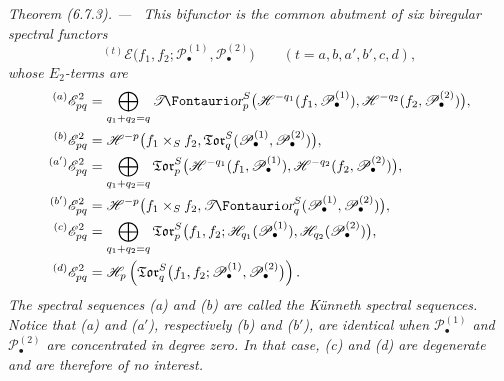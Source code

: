 \documentclass[10pt,oneside]{book}
\newcommand{\sh}[1]{\mathscr{#1}}
\newcommand{\shTor}{\sh{T}\textup{\kern-2.2pt{\Fontauri\slshape or}}}
\newenvironment{theorem}[1][]{\par\medskip\noindent\itshape Theorem (#1). ---\ }{\par}
\begin{document}
\begin{theorem}[6.7.3]
This bifunctor is the common abutment of six biregular spectral
functors
\[
  {}^{(t)}\sh E
  \bigl(
    f_1,f_2;
    \sh P_\bullet^{(1)},\sh P_\bullet^{(2)}
  \bigr)
  \qquad(t=a,b,a',b',c,d),
\]
whose $E_2$-terms are
\[
\begin{aligned}
  {}^{(a)}\sh E_{pq}^2
  &=
  \bigoplus_{q_1+q_2=q}
  \shTor_p^S
  \bigl(
    \sh H^{-q_1}(f_1,\sh P_\bullet^{(1)}),
    \sh H^{-q_2}(f_2,\sh P_\bullet^{(2)})
  \bigr),\\
  {}^{(b)}\sh E_{pq}^2
  &=
  \sh H^{-p}
  \bigl(
    f_1\times_Sf_2,
    \mathfrak{Tor}_q^S
    (\sh P_\bullet^{(1)},\sh P_\bullet^{(2)})
  \bigr),\\
  {}^{(a')}\sh E_{pq}^2
  &=
  \bigoplus_{q_1+q_2=q}
  \mathfrak{Tor}_p^S
  \bigl(
    \sh H^{-q_1}(f_1,\sh P_\bullet^{(1)}),
    \sh H^{-q_2}(f_2,\sh P_\bullet^{(2)})
  \bigr),\\
  {}^{(b')}\sh E_{pq}^2
  &=
  \sh H^{-p}
  \bigl(
    f_1\times_Sf_2,
    \shTor_q^S
    (\sh P_\bullet^{(1)},\sh P_\bullet^{(2)})
  \bigr),\\
  {}^{(c)}\sh E_{pq}^2
  &=
  \bigoplus_{q_1+q_2=q}
  \mathfrak{Tor}_p^S
  \bigl(
    f_1,f_2;
    \sh H_{q_1}(\sh P_\bullet^{(1)}),
    \sh H_{q_2}(\sh P_\bullet^{(2)})
  \bigr),\\
  {}^{(d)}\sh E_{pq}^2
  &=
  \sh H_p
  \left(
    \mathfrak{Tor}_q^S
    \bigl(
      f_1,f_2;
      \sh P_\bullet^{(1)},\sh P_\bullet^{(2)}
    \bigr)
  \right).
\end{aligned}
\]
The spectral sequences \textnormal{(a)} and \textnormal{(b)} are
called the \emph{K\"unneth spectral sequences}.  Notice that
\textnormal{(a)} and \textnormal{(a$'$)}, respectively
\textnormal{(b)} and \textnormal{(b$'$)}, are identical when
$\sh P_\bullet^{(1)}$ and $\sh P_\bullet^{(2)}$ are concentrated
in degree zero.  In that case, \textnormal{(c)} and
\textnormal{(d)} are degenerate and are therefore of no
interest.
\end{theorem}
\end{document}
